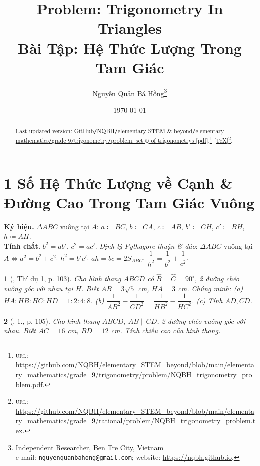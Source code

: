 \documentclass{article}
\title{Problem: Trigonometry In Triangles\\Bài Tập: Hệ Thức Lượng Trong Tam Giác}
\author{Nguyễn Quản Bá Hồng\footnote{Independent Researcher, Ben Tre City, Vietnam\\e-mail: \texttt{nguyenquanbahong@gmail.com}; website: \url{https://nqbh.github.io}.}}
\date{\today}
\newtheorem{baitoan}{}
\begin{document}
\maketitle
\begin{abstract}
	Last updated version: \href{https://github.com/NQBH/elementary_STEM_beyond/blob/main/elementary_mathematics/grade_9/trigonometry/problem/NQBH_trigonometry_problem.pdf}{GitHub{\tt/}NQBH{\tt/}elementary STEM \& beyond{\tt/}elementary mathematics{\tt/}grade 9{\tt/}trigonometry{\tt/}problem: set $\mathbb{Q}$ of trigonometrys [pdf]}.\footnote{\textsc{url}: \url{https://github.com/NQBH/elementary_STEM_beyond/blob/main/elementary_mathematics/grade_9/trigonometry/problem/NQBH_trigonometry_problem.pdf}.} [\href{https://github.com/NQBH/elementary_STEM_beyond/blob/main/elementary_mathematics/grade_9/trigonometry/problem/NQBH_trigonometry_problem.tex}{\TeX}]\footnote{\textsc{url}: \url{https://github.com/NQBH/elementary_STEM_beyond/blob/main/elementary_mathematics/grade_9/rational/problem/NQBH_trigonometry_problem.tex}.}. 
\end{abstract}
\tableofcontents


\section{1 Số Hệ Thức Lượng về Cạnh \& Đường Cao Trong Tam Giác Vuông}
\textbf{\textsf{Ký hiệu.}} $\Delta ABC$ vuông tại $A$: $a\coloneqq BC$, $b\coloneqq CA$, $c\coloneqq AB$, $b'\coloneqq CH$, $c'\coloneqq BH$, $h\coloneqq AH$.\\\textbf{\textsf{Tính chất.}}  $b^2 = ab'$, $c^2 = ac'$.  \textit{Định lý Pythagore thuận \& đảo}: $\Delta ABC$ vuông tại $A\Leftrightarrow a^2 = b^2 + c^2$.  $h^2 = b'c'$.  $ah = bc = 2S_{ABC}$.  $\dfrac{1}{h^2} = \dfrac{1}{b^2} + \dfrac{1}{c^2}$.

\begin{baitoan}[\cite{Tuyen_Toan_9_old}, Thí dụ 1, p. 103]
	Cho hình thang $ABCD$ có $\widehat{B} = \widehat{C} = 90^\circ$, 2 đường chéo vuông góc với nhau tại $H$. Biết $AB = 3\sqrt{5}$ \emph{cm}, $HA = 3$ \emph{cm}. Chứng minh: (a) $HA:HB:HC:HD = 1:2:4:8$. (b) $\dfrac{1}{AB^2} - \dfrac{1}{CD^2} = \dfrac{1}{HB^2} - \dfrac{1}{HC^2}$. (c) Tính $AD,CD$.
\end{baitoan}

\begin{baitoan}[\cite{Tuyen_Toan_9_old}, 1., p. 105]
	Cho hình thang $ABCD$, $AB\parallel CD$, 2 đường chéo vuông góc với nhau. Biết $AC = 16$ \emph{cm}, $BD = 12$ \emph{cm}. Tính chiều cao của hình thang.
\end{baitoan}
\end{document}
